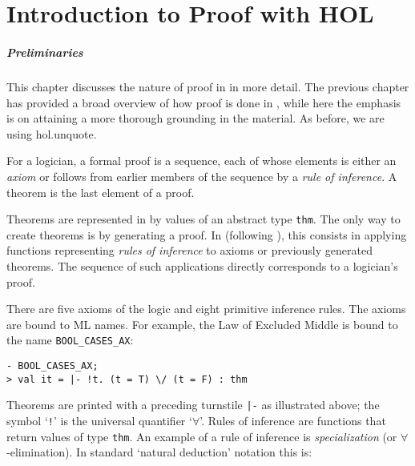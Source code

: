 \chapter{Introduction to Proof with HOL}
\label{proof}

\newcommand\tacticline{\hline \hline}
\newenvironment{proofenumerate}{\begin{enumerate}}{\end{enumerate}}


\paragraph{Preliminaries} This chapter discusses the nature of proof
in \HOL{} in more detail.  The previous chapter has provided a broad
overview of how proof is done in \HOL{}, while here the emphasis is on
attaining a more thorough grounding in the material.  As before, we
are using \textsf{hol.unquote}.

\setcounter{sessioncount}{0}

For a logician, a formal proof is a sequence, each of whose elements
is either an {\it axiom\/} or follows from earlier members of the
sequence by a {\it rule of inference\/}.  A theorem is the last
element of a proof.

Theorems are represented in \HOL{} by values of an abstract type
{\small\verb|thm|}.  The  only way  to create theorems is by generating a
proof.  In \HOL{} (following \LCF), this consists in applying \ML{} functions
representing {\it rules of inference\/} to  axioms or previously generated
theorems.  The sequence of such applications  directly corresponds to a
logician's proof.

There are five axioms of the \HOL{} logic and eight primitive
inference rules. The axioms are bound to ML names. For example, the Law of
Excluded Middle is bound to the \ML{} name {\small\verb|BOOL_CASES_AX|}:

\begin{session}
\begin{verbatim}
- BOOL_CASES_AX;
> val it = |- !t. (t = T) \/ (t = F) : thm
\end{verbatim}
\end{session}

Theorems are printed with a preceding turnstile {\small\verb+|-+} as
illustrated above; the symbol `{\small\verb|!|}' is the universal
quantifier `$\forall$'.  Rules of inference are \ML{} functions that
return values of type {\small\verb|thm|}.  An example of a rule of
inference is {\it specialization\/} (or $\forall$-elimination).  In
standard `natural deduction' notation this is:

